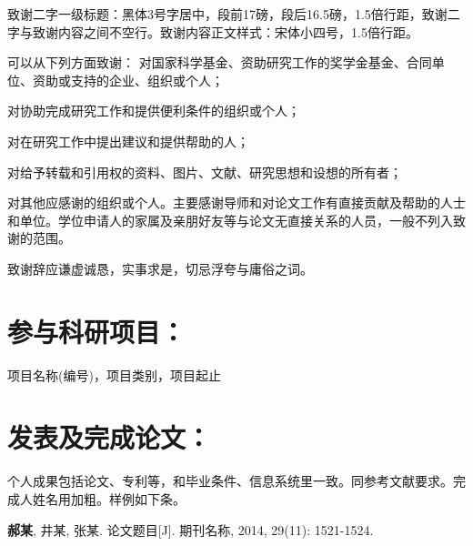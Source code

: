 \documentclass{cqupt_thesis}
\begin{document}
    \begin{acknowledgements}
        致谢二字一级标题：黑体3号字居中，段前17磅，段后16.5磅，1.5倍行距，致谢二字与致谢内容之间不空行。致谢内容正文样式：宋体小四号，1.5倍行距。

        可以从下列方面致谢：
        对国家科学基金、资助研究工作的奖学金基金、合同单位、资助或支持的企业、组织或个人；

        对协助完成研究工作和提供便利条件的组织或个人；

        对在研究工作中提出建议和提供帮助的人；

        对给予转载和引用权的资料、图片、文献、研究思想和设想的所有者；

        对其他应感谢的组织或个人。主要感谢导师和对论文工作有直接贡献及帮助的人士和单位。学位申请人的家属及亲朋好友等与论文无直接关系的人员，一般不列入致谢的范围。

        致谢辞应谦虚诚恳，实事求是，切忌浮夸与庸俗之词。

    \end{acknowledgements}

    \begin{mastermainwork}
        \section*{参与科研项目：}
        \begin{achievements}
            \item 项目名称(编号)，项目类别，项目起止
        \end{achievements}

        \section*{发表及完成论文：}
        \begin{achievements}
            \item 个人成果包括论文、专利等，和毕业条件、信息系统里一致。同参考文献要求。完成人姓名用加粗。样例如下条。
            \item \textbf{郝某}, 井某, 张某. 论文题目[J]. 期刊名称, 2014, 29(11): 1521-1524.
        \end{achievements}
    \end{mastermainwork}
\end{document}
